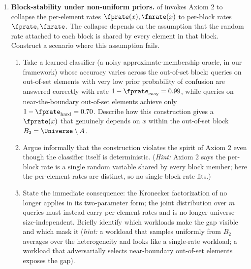 \begin{enumerate}
\item \exstarstarstar
\label{ex:ch5-10}
\textbf{Block-stability under non-uniform priors.}
 of  invokes
Axiom 2 to collapse the per-element rates $\fprate(x), \fnrate(x)$
to per-block rates $\fprate, \fnrate$. The collapse depends on the
assumption that the random rate attached to each block is shared by
every element in that block. Construct a scenario where this
assumption fails.
\begin{enumerate}
  \item[(a)] Take a learned classifier (a noisy approximate-membership
    oracle, in our framework) whose accuracy varies across the
    out-of-set block: queries on out-of-set elements with very low
    prior probability of confusion are answered correctly with rate
    $1 - \fprate_{\text{easy}} = 0.99$, while queries on
    near-the-boundary out-of-set elements achieve only
    $1 - \fprate_{\text{hard}} = 0.70$. Describe how this construction
    gives a $\fprate(x)$ that genuinely depends on $x$ within the
    out-of-set block $B_2 = \Universe \setminus A$.
  \item[(b)] Argue informally that the construction violates the
    spirit of Axiom 2 even though the classifier itself is
    deterministic. (\emph{Hint:} Axiom 2 says the per-block rate is
    a single random variable shared by every block member; here the
    per-element rates are distinct, so no single block rate fits.)
  \item[(c)] State the immediate consequence: the Kronecker
    factorization of  no longer applies in
    its two-parameter form; the joint distribution over $m$ queries
    must instead carry per-element rates and is no longer
    universe-size-independent. Briefly identify which workloads make
    the gap visible and which mask it (\emph{hint:} a workload that
    samples uniformly from $B_2$ averages over the heterogeneity and
    looks like a single-rate workload; a workload that adversarially
    selects near-boundary out-of-set elements exposes the gap).
\end{enumerate}


\end{enumerate}
